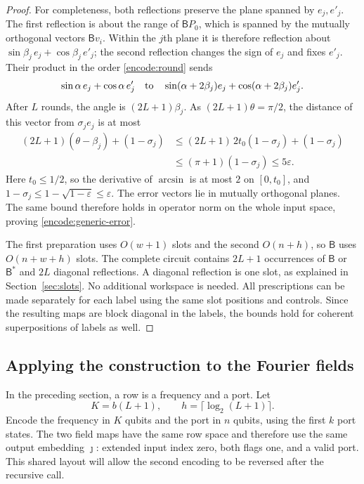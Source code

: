 \begin{proof}
For completeness, both reflections preserve the plane spanned by
$e_j,e'_j$. The first reflection is about the range of $\mathsf B P_0$,
which is spanned by the mutually orthogonal vectors $\mathsf Bv_i$.
Within the $j$th plane it is therefore reflection about
$\sin\beta_j\,e_j+\cos\beta_j\,e'_j$; the second reflection changes the
sign of $e_j$ and fixes $e'_j$. Their product in the order
\eqref{encode:round} sends
\[
 \sin\alpha\,e_j+\cos\alpha\,e'_j
 \quad\hbox{to}\quad
 \sin(\alpha+2\beta_j)e_j+\cos(\alpha+2\beta_j)e'_j.
\]
After $L$ rounds, the angle is $(2L+1)\beta_j$. As
$(2L+1)\theta=\pi/2$, the distance of this vector from $\sigma_j e_j$
is at most
\begin{align*}
 (2L+1)(\theta-\beta_j)+(1-\sigma_j)
 &\le (2L+1)\,2t_0(1-\sigma_j)+(1-\sigma_j)\\
 &\le(\pi+1)(1-\sigma_j)
 \le5\varepsilon.
\end{align*}
Here $t_0\le1/2$, so the derivative of $\arcsin$ is at most $2$ on
$[0,t_0]$, and
$1-\sigma_j\le1-\sqrt{1-\varepsilon}\le\varepsilon$.
The error vectors lie in mutually orthogonal planes. The same bound
therefore holds in operator norm on the whole input space, proving
\eqref{encode:generic-error}.

The first preparation uses $O(w+1)$ slots and the second $O(n+h)$, so
$\mathsf B$ uses $O(n+w+h)$ slots. The complete circuit contains
$2L+1$ occurrences of $\mathsf B$ or $\mathsf B^*$ and $2L$ diagonal
reflections. A diagonal reflection is one slot, as explained in
Section~\ref{sec:slots}. No additional workspace is needed. All prescriptions
can be made separately for each label using the same slot positions and
controls. Since the resulting maps are block diagonal in the labels,
the bounds hold for coherent superpositions of labels as well.
\end{proof}

\subsection{Applying the construction to the Fourier fields}

In the preceding section, a row is a frequency and a port. Let
\begin{equation}\label{encode:register-size}
 K=b(L+1),\qquad h=\lceil\log_2(L+1)\rceil.
\end{equation}
Encode the frequency in $K$ qubits and the port in $n$ qubits, using
the first $k$ port states. The two field maps have the same row space
and therefore use the same output embedding $\jmath$: extended input
index zero, both flags one, and a valid port. This shared layout will
allow the second encoding to be reversed after the recursive call.


